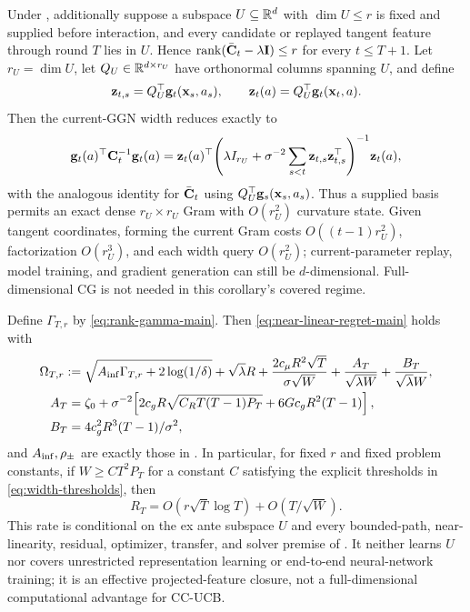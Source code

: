 \begin{corollary}\label{cor:rank-near-linear}
Under , additionally suppose a subspace
$U\subseteq\mathbb{R}^d$ with $\dim U\le r$ is fixed and supplied before interaction,
and every candidate or replayed tangent feature through round $T$ lies in $U$.
Hence $\operatorname{rank}(\bar{\mathbf{C}}_t-\lambda\mathbf{I})\le r$ for every
$t\le T+1$.  Let $r_U=\dim U$, let $Q_U\in\mathbb{R}^{d\times r_U}$ have
orthonormal columns spanning $U$, and define
\[
 \mathbf z_{t,s}=Q_U^\top\mathbf{g}_t(\mathbf{x}_s,a_s),\qquad
 \mathbf z_t(a)=Q_U^\top\mathbf{g}_t(\mathbf{x}_t,a).
\]
Then the current-GGN width reduces exactly to
\begin{equation}\label{eq:projected-width}
 \mathbf{g}_t(a)^\top\mathbf{C}_t^{-1}\mathbf{g}_t(a)
 =\mathbf z_t(a)^\top\!\left(\lambda I_{r_U}
 +\sigma^{-2}\sum_{s<t}\mathbf z_{t,s}\mathbf z_{t,s}^\top
 \right)^{-1}\!\mathbf z_t(a),
\end{equation}
with the analogous identity for $\bar{\mathbf{C}}_t$ using
$Q_U^\top\mathbf{g}_s(\mathbf{x}_s,a_s)$.  Thus a supplied basis permits an exact dense
$r_U\times r_U$ Gram with $O(r_U^2)$ curvature state.  Given tangent
coordinates, forming the current Gram costs $O((t-1)r_U^2)$, factorization
$O(r_U^3)$, and each width query $O(r_U^2)$; current-parameter replay, model
training, and gradient generation can still be $d$-dimensional.
Full-dimensional CG is not needed in this corollary's covered regime.

Define $\Gamma_{T,r}$ by \eqref{eq:rank-gamma-main}.  Then
\eqref{eq:near-linear-regret-main} holds with
\begin{align*}
\Omega_{T,r}:={}&
 \sqrt{A_{\rm inf}\Gamma_{T,r}+2\log(1/\delta)}+\sqrt\lambda R
 +\frac{2c_\mu R^2\sqrt T}{\sigma\sqrt W}
 +\frac{A_T}{\sqrt{\lambda W}}+\frac{B_T}{\sqrt\lambda W},\\
A_T={}&\zeta_0+\sigma^{-2}\!\left[
 2c_gR\sqrt{C_RT(T-1)P_T}+6Gc_gR^2(T-1)\right],\\
B_T={}&4c_g^2R^3(T-1)/\sigma^2,
\end{align*}
and $A_{\rm inf},\rho_\pm$ are exactly those in .
In particular, for fixed $r$ and fixed problem constants, if
$W\ge C T^2P_T$ for a constant $C$ satisfying the explicit thresholds in
\eqref{eq:width-thresholds}, then
\[
 R_T=O(r\sqrt T\log T)+O(T/\sqrt W).
\]
This rate is conditional on the ex ante subspace $U$ and every bounded-path,
near-linearity, residual, optimizer, transfer, and solver premise of
.  It neither learns $U$ nor covers unrestricted
representation learning or end-to-end neural-network training; it is an
effective projected-feature closure, not a full-dimensional computational
advantage for CC-UCB.
\end{corollary}
